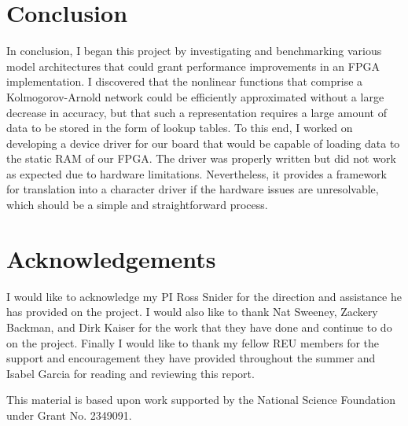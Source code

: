 \documentclass[psamsfonts]{amsart}
\theoremstyle{definition}
\theoremstyle{remark}
\numberwithin{equation}{section}
\begin{document}
\section{Conclusion}

In conclusion, I began this project by investigating and benchmarking various model architectures that could grant performance improvements in an FPGA implementation. I discovered that the nonlinear functions that comprise a Kolmogorov-Arnold network could be efficiently approximated without a large decrease in accuracy, but that such a representation requires a large amount of data to be stored in the form of lookup tables. To this end, I worked on developing a device driver for our board that would be capable of loading data to the static RAM of our FPGA. The driver was properly written but did not work as expected due to hardware limitations. Nevertheless, it provides a framework for translation into a character driver if the hardware issues are unresolvable, which should be a simple and straightforward process.


\section{Acknowledgements}
I would like to acknowledge my PI Ross Snider for the direction and assistance he has provided on the project. I would also like to thank Nat Sweeney, Zackery Backman, and Dirk Kaiser for the work that they have done and continue to do on the project. Finally I would like to thank my fellow REU members for the support and encouragement they have provided throughout the summer and Isabel Garcia for reading and reviewing this report.

This material is based upon work supported by the National Science Foundation under Grant No. 2349091.

\newpage
\nocite{*}


\end{document}
